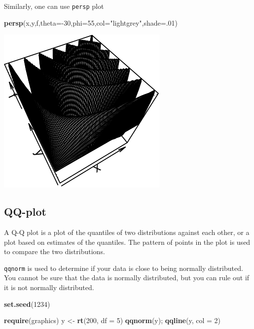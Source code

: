 \documentclass[]{article}
\newenvironment{Shaded}{\begin{snugshade}}{\end{snugshade}}
\newcommand{\KeywordTok}[1]{\textcolor[rgb]{0.13,0.29,0.53}{\textbf{{#1}}}}
\newcommand{\DataTypeTok}[1]{\textcolor[rgb]{0.13,0.29,0.53}{{#1}}}
\newcommand{\DecValTok}[1]{\textcolor[rgb]{0.00,0.00,0.81}{{#1}}}
\newcommand{\StringTok}[1]{\textcolor[rgb]{0.31,0.60,0.02}{{#1}}}
\newcommand{\NormalTok}[1]{{#1}}
\numberwithin{equation}{section}
\begin{document}
Similarly, one can use \texttt{persp} plot

\begin{Shaded}
\begin{Highlighting}[]
\KeywordTok{persp}\NormalTok{(x,y,f,}\DataTypeTok{theta=}\NormalTok{-}\DecValTok{30}\NormalTok{,}\DataTypeTok{phi=}\DecValTok{55}\NormalTok{,}\DataTypeTok{col=}\StringTok{"lightgrey"}\NormalTok{,}\DataTypeTok{shade=}\NormalTok{.}\DecValTok{01}\NormalTok{)}
\end{Highlighting}
\end{Shaded}

\includegraphics{index_files/figure-latex/unnamed-chunk-86-1.pdf}

\subsection{QQ-plot}\label{qq-plot}

A Q-Q plot is a plot of the quantiles of two distributions against each
other, or a plot based on estimates of the quantiles. The pattern of
points in the plot is used to compare the two distributions.

\texttt{qqnorm} is used to determine if your data is close to being
normally distributed. You cannot be sure that the data is normally
distributed, but you can rule out if it is not normally distributed.

\begin{Shaded}
\begin{Highlighting}[]
\KeywordTok{set.seed}\NormalTok{(}\DecValTok{1234}\NormalTok{)}

\KeywordTok{require}\NormalTok{(graphics)}
\NormalTok{y <-}\StringTok{ }\KeywordTok{rt}\NormalTok{(}\DecValTok{200}\NormalTok{, }\DataTypeTok{df =} \DecValTok{5}\NormalTok{)}
\KeywordTok{qqnorm}\NormalTok{(y); }
\KeywordTok{qqline}\NormalTok{(y, }\DataTypeTok{col =} \DecValTok{2}\NormalTok{)}
\end{Highlighting}
\end{Shaded}
\end{document}
